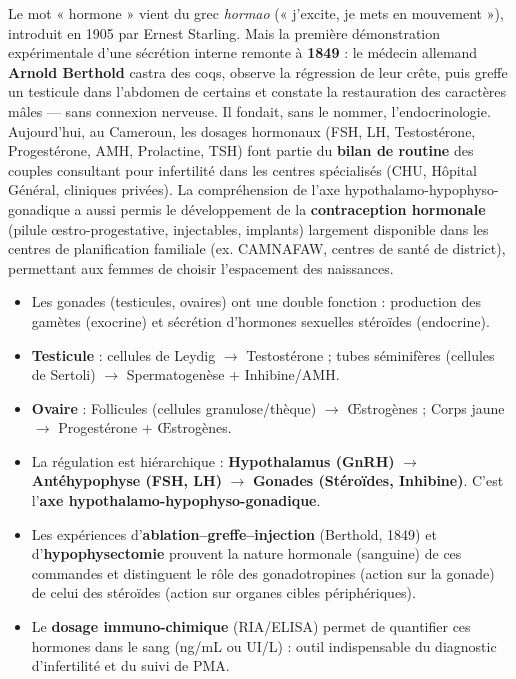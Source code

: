 \documentclass[11pt]{article}
\begin{document}
\begin{savaistu}
Le mot « hormone » vient du grec \emph{hormao} (« j'excite, je mets en mouvement »), introduit en 1905 par Ernest Starling. Mais la première démonstration expérimentale d'une sécrétion interne remonte à \textbf{1849} : le médecin allemand \textbf{Arnold Berthold} castra des coqs, observe la régression de leur crête, puis greffe un testicule dans l'abdomen de certains et constate la restauration des caractères mâles — sans connexion nerveuse. Il fondait, sans le nommer, l'endocrinologie.
Aujourd'hui, au Cameroun, les dosages hormonaux (FSH, LH, Testostérone, Progestérone, AMH, Prolactine, TSH) font partie du \textbf{bilan de routine} des couples consultant pour infertilité dans les centres spécialisés (CHU, Hôpital Général, cliniques privées). La compréhension de l'axe hypothalamo-hypophyso-gonadique a aussi permis le développement de la \textbf{contraception hormonale} (pilule œstro-progestative, injectables, implants) largement disponible dans les centres de planification familiale (ex. CAMNAFAW, centres de santé de district), permettant aux femmes de choisir l'espacement des naissances.
\end{savaistu}

\begin{aretenir}
\begin{itemize}
\item Les gonades (testicules, ovaires) ont une double fonction : production des gamètes (exocrine) et sécrétion d'hormones sexuelles stéroïdes (endocrine).
\item \textbf{Testicule} : cellules de Leydig $\rightarrow$ Testostérone ; tubes séminifères (cellules de Sertoli) $\rightarrow$ Spermatogenèse + Inhibine/AMH.
\item \textbf{Ovaire} : Follicules (cellules granulose/thèque) $\rightarrow$ Œstrogènes ; Corps jaune $\rightarrow$ Progestérone + Œstrogènes.
\item La régulation est hiérarchique : \textbf{Hypothalamus (GnRH)} $\rightarrow$ \textbf{Antéhypophyse (FSH, LH)} $\rightarrow$ \textbf{Gonades (Stéroïdes, Inhibine)}. C'est l'\textbf{axe hypothalamo-hypophyso-gonadique}.
\item Les expériences d'\textbf{ablation--greffe--injection} (Berthold, 1849) et d'\textbf{hypophysectomie} prouvent la nature hormonale (sanguine) de ces commandes et distinguent le rôle des gonadotropines (action sur la gonade) de celui des stéroïdes (action sur organes cibles périphériques).
\item Le \textbf{dosage immuno-chimique} (RIA/ELISA) permet de quantifier ces hormones dans le sang (ng/mL ou UI/L) : outil indispensable du diagnostic d'infertilité et du suivi de PMA.
\end{itemize}
\end{aretenir}
\end{document}

